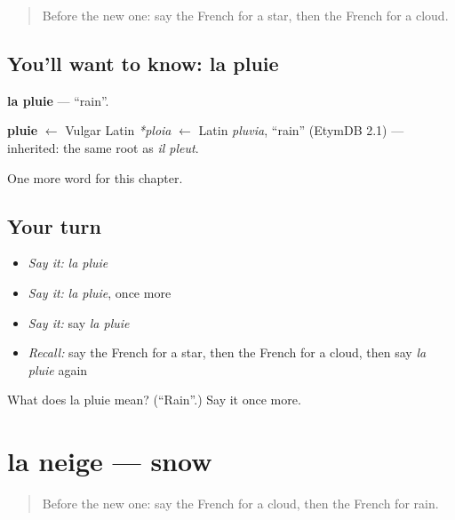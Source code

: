 \label{lesson:FR-C83-pluie}



\begin{quote}
Before the new one: say the French for a star, then the French for a cloud.
\end{quote}

\subsection*{You'll want to know: la pluie}
\textbf{la pluie} — \textquotedblleft{}rain\textquotedblright{}.

\begin{cousinweb}
\textbf{pluie} $\leftarrow$ Vulgar Latin \emph{*ploia} $\leftarrow$ Latin \emph{pluvia}, \textquotedblleft{}rain\textquotedblright{} (EtymDB 2.1) — inherited: the same root as \emph{il pleut}.
\end{cousinweb}

\begin{grammarlens}[title={What you've built}]
One more word for this chapter.
\end{grammarlens}

\subsection*{Your turn}
\begin{itemize}
\raggedright
  \item \emph{Say it:} \emph{la pluie}
  \item \emph{Say it:} \emph{la pluie}, once more
  \item \emph{Say it:} say \emph{la pluie}
  \item \emph{Recall:} say the French for a star, then the French for a cloud, then say \emph{la pluie} again
\end{itemize}

\begin{tcolorbox}[breakable,colback=teal!4,colframe=teal!35!black,title={Before you move on}]
What does la pluie mean? (\textquotedblleft{}Rain\textquotedblright{}.) Say it once more.
\end{tcolorbox}
\section[la neige]{la neige — snow}

\label{lesson:FR-C83-neige}



\begin{quote}
Before the new one: say the French for a cloud, then the French for rain.
\end{quote}


